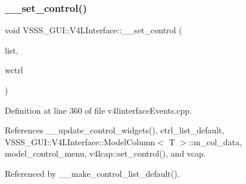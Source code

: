 \subsubsection{\texorpdfstring{\+\_\+\+\_\+set\+\_\+control()}{\_\_set\_control()}}
{\footnotesize\ttfamily void V\+S\+S\+S\+\_\+\+G\+U\+I\+::\+V4\+L\+Interface\+::\+\_\+\+\_\+set\+\_\+control (\begin{DoxyParamCaption}\item[{std\+::list$<$ \hyperlink{namespace_v_s_s_s___g_u_i_a9eff2f5504f050458ee4bcf362482a8d}{Control\+Holder} $>$ $\ast$}]{list,  }\item[{Gtk\+::\+Widget $\ast$}]{wctrl }\end{DoxyParamCaption})\hspace{0.3cm}{\ttfamily [private]}}



Definition at line 360 of file v4linterface\+Events.\+cpp.



References \+\_\+\+\_\+update\+\_\+control\+\_\+widgets(), ctrl\+\_\+list\+\_\+default, V\+S\+S\+S\+\_\+\+G\+U\+I\+::\+V4\+L\+Interface\+::\+Model\+Column$<$ T $>$\+::m\+\_\+col\+\_\+data, model\+\_\+control\+\_\+menu, v4lcap\+::set\+\_\+control(), and vcap.



Referenced by \+\_\+\+\_\+make\+\_\+control\+\_\+list\+\_\+default().


